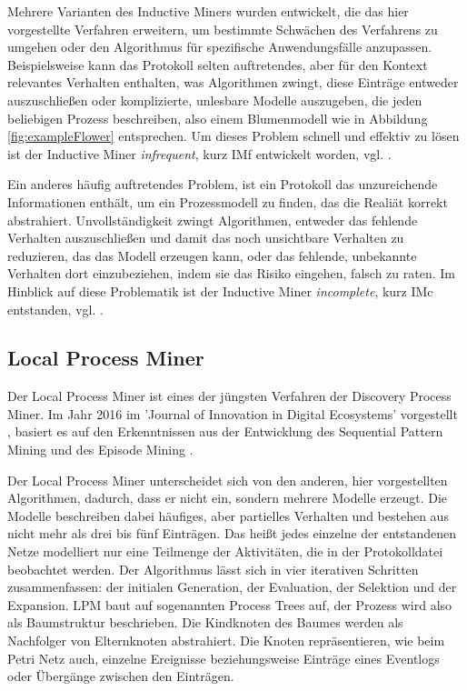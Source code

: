 Mehrere Varianten des Inductive Miners wurden entwickelt, die das hier vorgestellte Verfahren erweitern, um bestimmte Schwächen des Verfahrens zu umgehen oder den Algorithmus für spezifische Anwendungsfälle anzupassen. 
Beispielsweise kann das Protokoll selten auftretendes, aber für den Kontext relevantes Verhalten enthalten, was Algorithmen zwingt, diese Einträge entweder auszuschließen oder komplizierte, unlesbare Modelle auszugeben, die jeden beliebigen Prozess beschreiben, also einem  Blumenmodell wie in Abbildung \ref{fig:exampleFlower} entsprechen. Um dieses Problem schnell und effektiv zu lösen ist der Inductive Miner \textit{infrequent}, kurz IMf entwickelt worden, vgl.  \cite{inducFMining}.

Ein anderes häufig auftretendes Problem, ist ein Protokoll das unzureichende Informationen enthält, um ein Prozessmodell zu finden, das die Realiät korrekt abstrahiert. Unvollständigkeit zwingt Algorithmen, entweder das fehlende Verhalten auszuschließen und damit das noch unsichtbare Verhalten zu reduzieren, das das Modell erzeugen kann, oder das fehlende, unbekannte Verhalten dort einzubeziehen, indem sie das Risiko eingehen, falsch zu raten. Im Hinblick auf diese Problematik ist der Inductive Miner \textit{incomplete}, kurz IMc entstanden, vgl. \cite{inducIMining}.

\subsection{Local Process Miner}
Der Local Process Miner ist eines der jüngsten Verfahren der Discovery Process Miner. Im Jahr 2016 im 'Journal of Innovation in Digital Ecosystems' vorgestellt \cite{localMining}, basiert es auf den Erkenntnissen aus der Entwicklung des Sequential Pattern Mining \cite{Srikant1996MiningSP} und des Episode Mining \cite{mannila1997discovery}.

Der Local Process Miner unterscheidet sich von den anderen, hier vorgestellten Algorithmen, dadurch, dass er nicht ein, sondern mehrere Modelle erzeugt. Die Modelle beschreiben dabei häufiges, aber partielles Verhalten und bestehen  aus nicht mehr als drei bis fünf Einträgen. Das heißt jedes einzelne der entstandenen Netze modelliert nur eine Teilmenge der Aktivitäten, die in der Protokolldatei beobachtet werden. Der Algorithmus lässt sich in vier iterativen Schritten zusammenfassen: der initialen Generation, der Evaluation, der Selektion und der Expansion. LPM baut auf sogenannten Process Trees auf, der Prozess wird also als Baumstruktur beschrieben. Die  Kindknoten des Baumes werden als Nachfolger von Elternknoten abstrahiert. Die Knoten repräsentieren, wie beim Petri Netz auch, einzelne Ereignisse beziehungsweise Einträge eines Eventlogs oder Übergänge zwischen den Einträgen. 

